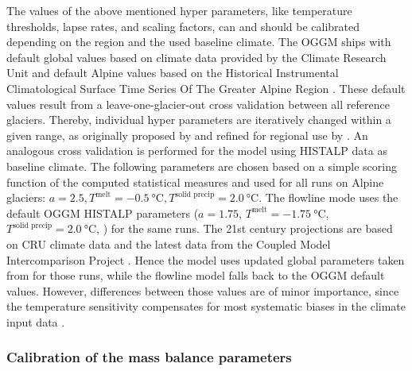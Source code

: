 
        The values of the above mentioned hyper parameters, like temperature thresholds, lapse rates, and scaling factors, can and should be calibrated depending on the region and the used baseline climate. The OGGM ships with default global values based on climate data provided by the Climate Research Unit \citep[CRU,][]{Harris2014} and default Alpine values based on the Historical Instrumental Climatological Surface Time Series Of The Greater Alpine Region \citep[HISTALP, ][]{Auer2007}. These default values result from a leave-one-glacier-out cross validation between all reference glaciers. Thereby, individual hyper parameters are iteratively changed within a given range, as originally proposed by \citet{Marzeion2012b} and refined for regional use by \citet{Dusch2018}. An analogous cross validation is performed for the \vas{} model using HISTALP data as baseline climate. The following parameters are chosen based on a simple scoring function of the computed statistical measures and used for all runs on Alpine glaciers: $a = 2.5, T^\text{melt} = \SI{-0.5}{\celsius}, T^\text{solid precip} = \SI{2.0}{\celsius}$. The flowline mode uses the default OGGM HISTALP parameters ($a = 1.75$, $T^\text{melt} = \SI{-1.75}{\celsius}$, $T^\text{solid precip} = \SI{2.0}{\celsius}$, \citet{Dusch2018}) for the same runs. The 21st century projections are based on CRU climate data and the latest data from the Coupled Model Intercomparison Project \citep[CMIP6, ][]{Eyring2016_CMIP}. Hence the \vas{} model uses updated global parameters taken from \citet{Malles2020} for those runs, while the flowline model falls back to the OGGM default values. However, differences between those values are of minor importance, since the temperature sensitivity \mustar{} compensates for most systematic biases in the climate input data \citep[Appendix A]{Maussion2019}.

        \subsubsection{Calibration of the mass balance parameters} %
        \label{ssub:mb_calib}

